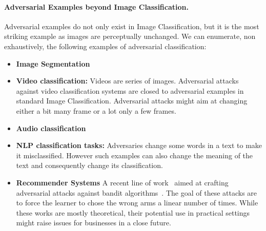 \paragraph{Adversarial Examples beyond Image Classification.} Adversarial examples do not only exist in Image Classification, but it is the most striking example as images are perceptually unchanged. We can enumerate, non exhaustively, the following examples of adversarial classification:
\begin{itemize}
    \item \textbf{Image Segmentation}
    \item \textbf{Video classification:} Videos are series of images. Adversarial attacks against video classification systems are closed to adversarial examples in standard Image Classification. Adversarial attacks might aim at changing either a bit many frame or a lot only a few frames. 
    \item \textbf{Audio classification}
    \item \textbf{NLP classification tasks:} Adversaries change some words in a text to make it misclassified. However such examples can also change the meaning of the text and consequently change its classification. 
    \item \textbf{Recommender Systems} A recent line of work~\cite{xxx,garcelon2020adversarial} aimed at crafting adversarial attacks against bandit algorithms~\citep{lattimore2018bandit}. The goal of these attacks are to force the learner to chose the wrong arms a linear number of times. While these works are mostly theoretical, their potential use in practical settings might raise issues for businesses in a close future.
\end{itemize}




